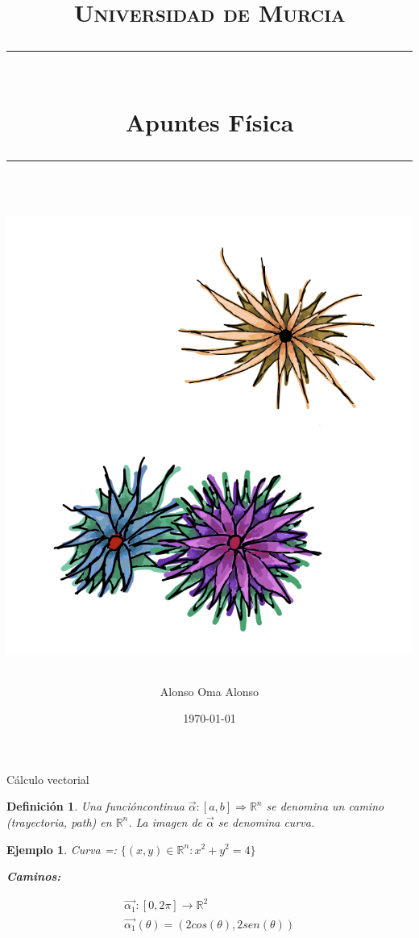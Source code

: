\documentclass[10pt, letterpaper]{article}
\title{	

	\normalfont\normalsize
	\textsc{Universidad de Murcia}\\ 
	\vspace{25pt} %
	\rule{\linewidth}{0.5pt} %
	\vspace{20pt}\\ %
	{\huge Apuntes Física
}\\ %
	\vspace{12pt} %
	\rule{\linewidth}{2pt}\\ %
	\vspace{12pt} %
	\includegraphics[scale=0.25]{floresportada.png}
}
\author{\LARGE Alonso Oma Alonso} %
\date{\normalsize\today} %
\newcommand{\negrita}[1]{\textbf{#1}}
\newtheorem{definition}{Definición}[section]
\newtheorem{example}{Ejemplo}[section]
\begin{document}
\begin{titlepage}
	\maketitle
\end{titlepage}

\newpage
\tableofcontents
\newpage

\begin{section} {Cálculo vectorial}
    \begin{definition}
        Una funcióncontinua $\vec{\alpha}:\left[a, b\right] \Rightarrow \mathbb{R}^n$ se denomina un camino (trayectoria, path) en $\mathbb{R}^n$. La imagen de $\vec{\alpha}$ se denomina curva.
    \end{definition}

    \begin{example}
        Curva =: $\{(x,y) \in \mathbb{R}^n: x^2 + y^2 = 4\}$

        \negrita{Caminos:}

        \[\begin{matrix}
            \vec{\alpha_1}: \left[0, 2\pi \right] \rightarrow \mathbb{R}^2 \\
            \vec{\alpha_1}(\theta) = (2cos(\theta), 2sen(\theta))
        \end{matrix}\]

    \end{example}
\end{section}
\end{document}
